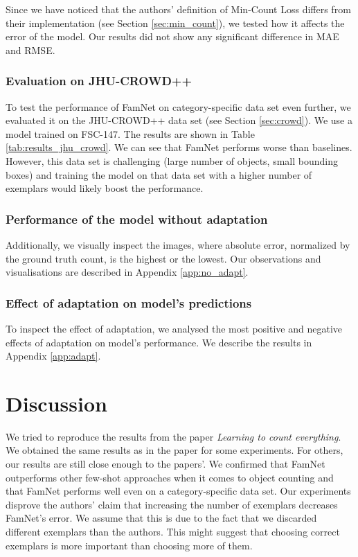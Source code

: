 Since we have noticed that the authors' definition of Min-Count Loss differs from their implementation (see Section \ref{sec:min_count}), we tested how it affects the error of the model. Our results did not show any significant difference in MAE and RMSE.

\subsubsection{Evaluation on JHU-CROWD++}

To test the performance of FamNet on category-specific data set even further, we evaluated it on the JHU-CROWD++ data set (see Section \ref{sec:crowd}). We use a model trained on FSC-147. The results are shown in Table \ref{tab:results_jhu_crowd}. We can see that FamNet performs worse than baselines. However, this data set is challenging (large number of objects, small bounding boxes) and training the model on that data set with a higher number of exemplars would likely boost the performance.

\subsubsection{Performance of the model without adaptation}

Additionally, we visually inspect the images, where absolute error, normalized by the ground truth count, is the highest or the lowest. Our observations and visualisations are described in Appendix \ref{app:no_adapt}.

\subsubsection{Effect of adaptation on model's predictions}

To inspect the effect of adaptation, we analysed the most positive and negative effects of adaptation on model's performance. We describe the results in Appendix \ref{app:adapt}.

\section{Discussion}

We tried to reproduce the results from the paper \textit{Learning to count everything}. We obtained the same results as in the paper for some experiments. For others, our results are still close enough to the papers'. We confirmed that FamNet outperforms other few-shot approaches when it comes to object counting and that FamNet performs well even on a category-specific data set. Our experiments disprove the authors' claim that increasing the number of exemplars decreases FamNet's error. We assume that this is due to the fact that we discarded different exemplars than the authors. This might suggest that choosing correct exemplars is more important than choosing more of them.

